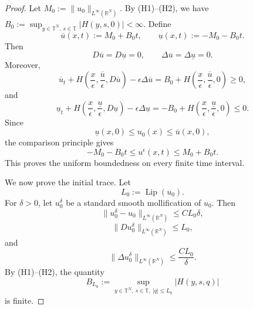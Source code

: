 \documentclass[preprint]{elsarticle}
\numberwithin{equation}{section}
\begin{document}
\begin{proof}
Let
$
M_0:=\|u_0\|_{L^\infty(\mathbb R^N)}.
$
By \textup{(H1)}--\textup{(H2)}, we have $B_0:=
\sup_{y\in\mathbb T^N,\ s\in\mathbb T}
|H(y,s,0)|<\infty.$
Define
$$
\overline u(x,t):=M_0+B_0t,
\qquad
\underline u(x,t):=-M_0-B_0t.
$$
Then
$$
D\overline u=D\underline u=0,
\qquad
\Delta\overline u=\Delta\underline u=0.
$$
Moreover,
\begin{equation*}
\overline u_t+
H\left(
\dfrac{x}{\epsilon},
\dfrac{\overline u}{\epsilon},
D\overline u
\right)
-
\epsilon\Delta\overline u
=
B_0+
H\left(
\dfrac{x}{\epsilon},
\dfrac{\overline u}{\epsilon},
0
\right)
\ge0,
\end{equation*}
and
\begin{equation*}
\underline u_t+
H\left(
\dfrac{x}{\epsilon},
\dfrac{\underline u}{\epsilon},
D\underline u
\right)
-
\epsilon\Delta\underline u
=
-B_0+
H\left(
\dfrac{x}{\epsilon},
\dfrac{\underline u}{\epsilon},
0
\right)
\le0.
\end{equation*}
Since
$$
\underline u(x,0)\le u_0(x)\le\overline u(x,0),
$$
the comparison principle gives
\begin{equation*}
-M_0-B_0t\le u^\epsilon(x,t)\le M_0+B_0t.
\end{equation*}
This proves the uniform boundedness on every finite time interval.

We now prove the initial trace. Let
$$
L_0:=\operatorname{Lip}(u_0).
$$
For $\delta>0$, let $u_0^\delta$ be a standard smooth mollification of $u_0$. Then
\begin{equation*}
\|u_0^\delta-u_0\|_{L^\infty(\mathbb R^N)}
\le C L_0\delta,
\end{equation*}
\begin{equation*}
\|Du_0^\delta\|_{L^\infty(\mathbb R^N)}
\le L_0,
\end{equation*}
and
\begin{equation*}
\|\Delta u_0^\delta\|_{L^\infty(\mathbb R^N)}
\le
\frac{C L_0}{\delta}.
\end{equation*}
By \textup{(H1)}--\textup{(H2)}, the quantity
\begin{equation*}
B_{L_0}:=
\sup_{y\in\mathbb T^N,\ s\in\mathbb T,\ |q|\le L_0}
|H(y,s,q)|
\end{equation*}
is finite.


\end{proof}
\end{document}
